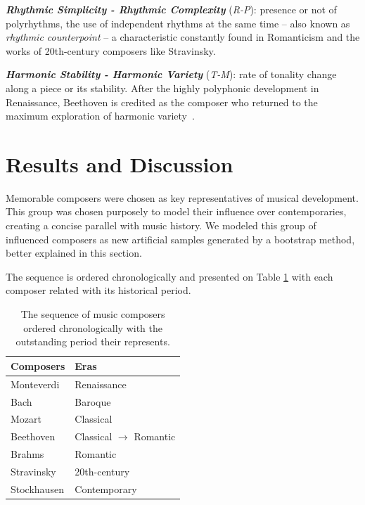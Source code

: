 \documentclass[
 aip,
 jmp,
 amsmath,amssymb,
 reprint,
]{revtex4-1}
\begin{document}
{\bf \em{ Rhythmic Simplicity - Rhythmic Complexity}} (\emph{R-P}): presence or not of polyrhythms, the
use of independent rhythms at the same time -- also known as
\textit{rhythmic counterpoint}\cite{BennettHistory} -- a characteristic
constantly found in Romanticism and the works of 20th-century composers like Stravinsky.

{\bf \em{ Harmonic Stability - Harmonic Variety}} (\emph{T-M}):
rate of tonality change along a piece or its stability. After the highly
polyphonic development in Renaissance, Beethoven is credited as the
composer who returned to the maximum exploration of harmonic variety~\cite{Webern}.

\section{Results and Discussion}
\label{sec:results}

Memorable composers were chosen as key representatives
of musical development. 
This group was chosen purposely to model their influence
over contemporaries, creating a concise parallel with music history. We modeled this group of influenced
composers as new artificial samples generated by a bootstrap method, better
explained in this section.

The sequence
is ordered chronologically and presented on Table \ref{tab:table0} with
each composer related with its historical period.

\begin{table}[ht]
\caption{\label{tab:table0} The sequence of music composers ordered chronologically
with the outstanding period their represents.}

\begin{tabular}{|l||l|}
\hline

 Composers       &  Eras \\ \hline

 Monteverdi      & Renaissance \\
 Bach            & Baroque \\
 Mozart          & Classical \\
 Beethoven       & Classical $\to$ Romantic \\
 Brahms          & Romantic \\
 Stravinsky      & 20th-century \\
 Stockhausen     & Contemporary\\

\hline
\end{tabular}
\end{table}
\end{document}
